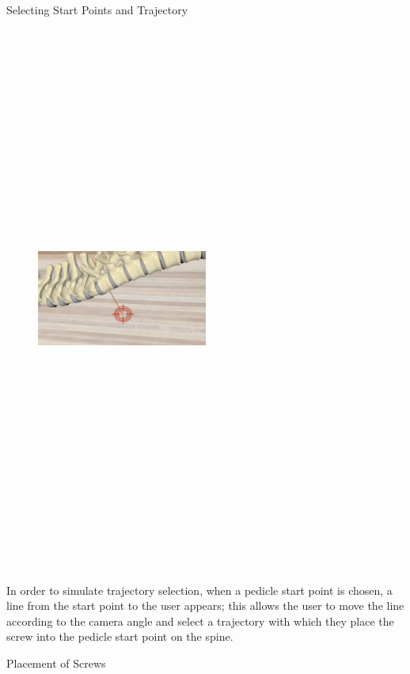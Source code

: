 \documentclass[final]{beamer}
\newlength{\onecolwid}
\begin{document}
\begin{frame}[t]
\begin{columns}[t]
\begin{column}{\onecolwid}
\begin{block}{\LARGE Selecting Start Points and Trajectory}
\begin{figure}
\centering
\includegraphics[width=0.5\textwidth, height=18cm]{trajectory.png}

\end{figure}

\large 
In order to simulate trajectory selection, when a pedicle start point is chosen, a line from the start point to the user appears; this allows the user to move the line according to the camera angle and select a trajectory with which they place the screw into the pedicle start point on the spine.

\end{block}

\begin{block}{\LARGE Placement of Screws}


\end{block}
\end{column}
\end{columns}
\end{frame}
\end{document}

